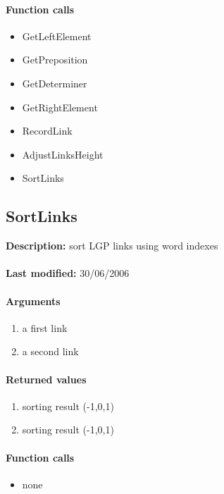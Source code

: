 \paragraph{Function calls}
\begin{itemize}
\item GetLeftElement
\item GetPreposition
\item GetDeterminer
\item GetRightElement
\item RecordLink
\item AdjustLinksHeight
\item SortLinks
\end{itemize}

\subsection{SortLinks}
\textbf{Description:} sort LGP links using word indexes\\
\\\textbf{Last modified:} 30/06/2006

\paragraph{Arguments}
\begin{enumerate}
\item a first link
\item a second link
\end{enumerate}

\paragraph{Returned values}
\begin{enumerate}
\item sorting result (-1,0,1)
\item sorting result (-1,0,1)
\end{enumerate}

\paragraph{Function calls}
\begin{itemize}
\item none
\end{itemize}

